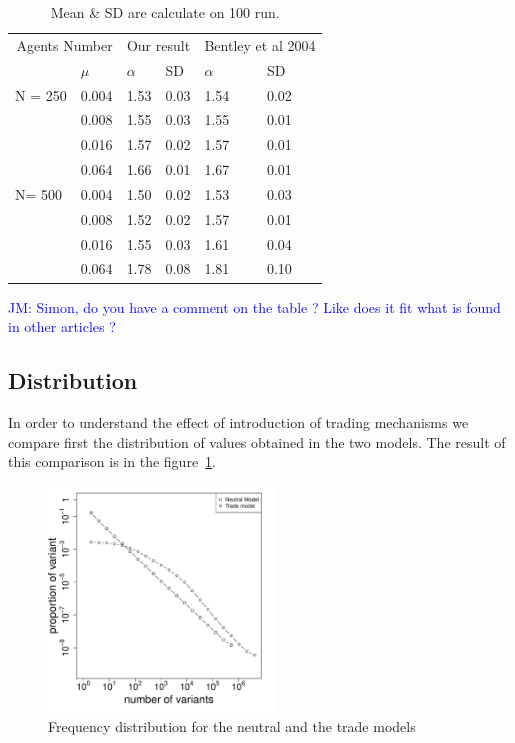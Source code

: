 \documentclass{wscpaperproc}
\newcommand{\memo}[2]{\textcolor{#1}{#2}}
\newcommand{\jm}[1]{\memo{blue}{JM: #1\\}}
\begin{document}
\begin{table}[h]
	\centering
	\begin{tabular}{ll|llll}
		\multicolumn{2}{r}{Agents Number}&\multicolumn{2}{c}{Our result}&\multicolumn{2}{c}{Bentley et al 2004}\\
			&$\mu$ & $\alpha$ & SD&$\alpha$&SD\\\hline
		N = 250	&0.004&1.53&0.03&1.54&0.02\\
			&0.008&1.55&0.03&1.55&0.01\\
			&0.016&1.57&0.02&1.57&0.01\\
			&0.064&1.66&0.01&1.67&0.01\\\hline
		N= 500	&0.004&1.50&0.02&1.53&0.03\\
			&0.008&1.52&0.02&1.57&0.01\\
			&0.016&1.55&0.03&1.61&0.04\\
			&0.064&1.78&0.08&1.81&0.10\\
	\end{tabular}
	\caption{Mean \& SD are calculate on 100 run.}
	\label{tab:mualpha}
\end{table}

\jm{Simon, do you have a comment on the table ? Like does it fit what is found in other articles ?}

\subsection{Distribution}

In order to understand the effect of introduction of trading mechanisms we compare first the distribution of values obtained in the two models. The result of this comparison is in the figure~\ref{fig:2setDi}. 

\begin{figure}[H]
	\begin{center}
		\includegraphics[width=6cm]{img/2SetupDistrib.pdf}
	\end{center}
	\caption{Frequency distribution for the neutral and the trade models}
	\label{fig:2setDi}
\end{figure}
\end{document}
